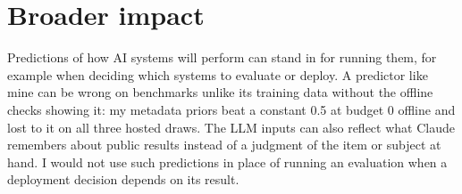 \section{Broader impact}\label{app:impact}

Predictions of how AI systems will perform can stand in for running them, for example when deciding which systems to evaluate or deploy. A predictor like mine can be wrong on benchmarks unlike its training data without the offline checks showing it: my metadata priors beat a constant 0.5 at budget 0 offline and lost to it on all three hosted draws. The LLM inputs can also reflect what Claude remembers about public results instead of a judgment of the item or subject at hand. I would not use such predictions in place of running an evaluation when a deployment decision depends on its result.
